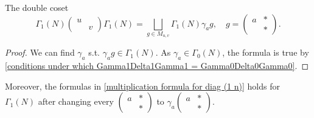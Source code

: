 \begin{proposition}
    The double coset
    \[\Gamma_1(N)\begin{pmatrix}
        u & \\ & v
    \end{pmatrix}\Gamma_1(N) = \bigsqcup_{g\in M_{u, v}}\Gamma_1(N)\gamma_a g,\quad g = \begin{pmatrix}
        a & *\\ & *
    \end{pmatrix}.\]
\end{proposition}
\begin{proof}
    We can find $\gamma_a$ s.t. $\gamma_ag\in\Gamma_1(N)$.
    As $\gamma_a\in\Gamma_0(N)$, the formula is true by \cref{conditions under which Gamma1Delta1Gamma1 = Gamma0Delta0Gamma0}.
\end{proof}
Moreover, the formulas in \cref{multiplication formula for diag (1 n)} holds for $\Gamma_1(N)$ after changing every \(\begin{pmatrix}
    a & * \\ & *
\end{pmatrix}\) to \(\gamma_a\begin{pmatrix}
    a & * \\ & *
\end{pmatrix}\).

